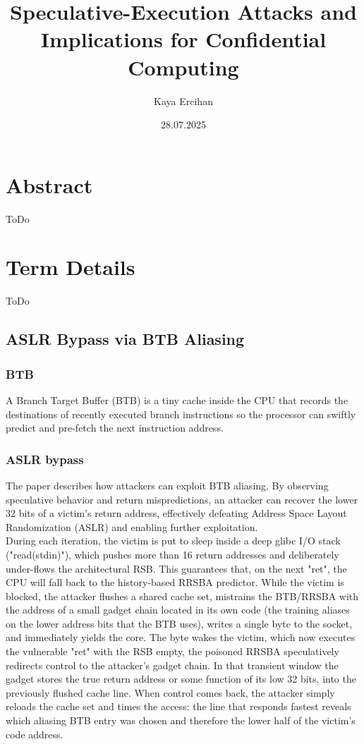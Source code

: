 \documentclass[11pt,a4paper]{article}
\title{Speculative-Execution Attacks and Implications for Confidential Computing}
\author{Kaya Ercihan}
\date{28.07.2025}
\begin{document}
\maketitle

\section*{Abstract}
ToDo

\section{Term Details}
ToDo

\subsection{ASLR Bypass via BTB Aliasing}
\subsubsection{BTB} 
A Branch Target Buffer (BTB) is a tiny cache inside the CPU that records the destinations of recently executed branch instructions so the processor can swiftly predict and pre-fetch the next instruction address.

\subsubsection{ASLR bypass}
The paper\cite{wikner25} describes how attackers can exploit BTB aliasing. By observing speculative behavior and return mispredictions, an attacker can recover the lower 32 bits of a victim’s return address, effectively defeating Address Space Layout Randomization (ASLR) and enabling further exploitation.\\


During each iteration, the victim is put to sleep inside a deep glibc I/O stack ("read(stdin)"), which pushes more than 16 return addresses and deliberately under-flows the architectural RSB. This guarantees that, on the next "ret", the CPU will fall back to the history-based RRSBA predictor. While the victim is blocked, the attacker flushes a shared cache set, mistrains the BTB/RRSBA with the address of a small gadget chain located in its own code (the training aliases on the lower address bits that the BTB uses), writes a single byte to the socket, and immediately yields the core. The byte wakes the victim, which now executes the vulnerable "ret" with the RSB empty, the poisoned RRSBA speculatively redirects control to the attacker’s gadget chain. In that transient window the gadget stores the true return address or some function of its low 32 bits, into the previously flushed cache line. When control comes back, the attacker simply reloads the cache set and times the access: the line that responds fastest reveals which aliasing BTB entry was chosen and therefore the lower half of the victim’s code address. 
\end{document}
